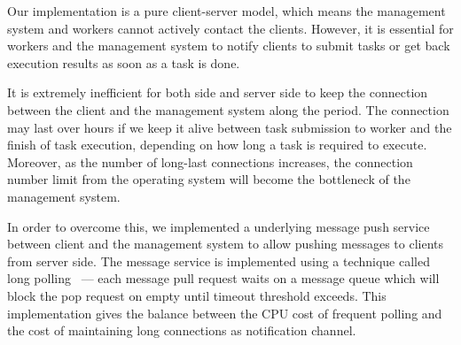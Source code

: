Our implementation is a pure client-server model, which means the
management system and workers cannot actively contact the clients.
However, it is essential for workers and the management system to notify
clients to submit tasks or get back execution results as soon as a task
is done.

It is extremely inefficient for both side and server side to keep the
connection between the client and the management system along the
period.
The connection may last over hours if we keep it alive between task
submission to worker and the finish of task execution, depending on how
long a task is required to execute.
Moreover, as the number of long-last connections increases, the
connection number limit from the operating system will become the
bottleneck of the management system.

In order to overcome this, we implemented a underlying message push
service between client and the management system to allow pushing
messages to clients from server side.
The message service is implemented using a technique called long
polling~\cite{cite:push-pull} --- each message pull request waits on a
message queue which will block the pop request on empty until timeout
threshold exceeds.
This implementation gives the balance between the CPU cost of frequent
polling and the cost of maintaining long connections as notification
channel.

